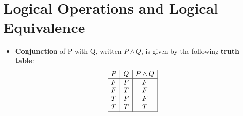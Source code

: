 \documentclass{report}
\begin{document}
	\section{Logical Operations and Logical Equivalence}
		\begin{itemize}\addtolength{\leftskip}{2em}
			\item \textbf{Conjunction} of P with Q, written $P\wedge Q$, is given by the following \textbf{truth table}:
				\begin{displaymath}
				\begin{array}{|c|c|c|c|c|c|c}
				   P
				 & Q
				 & P\wedge Q\\
				\hline
				F & F & F\\
				F & T & F\\
				T & F & F\\
				T & T & T\\
				\hline
				\end{array}
				\end{displaymath}
				

\end{itemize}
\end{document}
